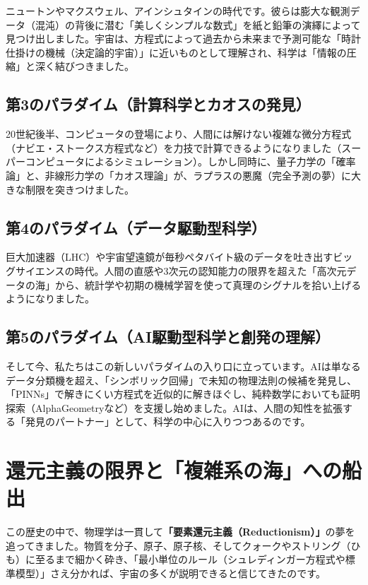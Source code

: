 ニュートンやマクスウェル、アインシュタインの時代です。彼らは膨大な観測データ（混沌）の背後に潜む「美しくシンプルな数式」を紙と鉛筆の演繹によって見つけ出しました。宇宙は、方程式によって過去から未来まで予測可能な「時計仕掛けの機械（決定論的宇宙）」に近いものとして理解され、科学は「情報の圧縮」と深く結びつきました。

\subsection{第3のパラダイム（計算科学とカオスの発見）}

20世紀後半、コンピュータの登場により、人間には解けない複雑な微分方程式（ナビエ・ストークス方程式など）を力技で計算できるようになりました（スーパーコンピュータによるシミュレーション）。しかし同時に、量子力学の「確率論」と、非線形力学の「カオス理論」が、ラプラスの悪魔（完全予測の夢）に大きな制限を突きつけました。

\subsection{第4のパラダイム（データ駆動型科学）}

巨大加速器（LHC）や宇宙望遠鏡が毎秒ペタバイト級のデータを吐き出すビッグサイエンスの時代。人間の直感や3次元の認知能力の限界を超えた「高次元データの海」から、統計学や初期の機械学習を使って真理のシグナルを拾い上げるようになりました。

\subsection{第5のパラダイム（AI駆動型科学と創発の理解）}

そして今、私たちはこの新しいパラダイムの入り口に立っています。AIは単なるデータ分類機を超え、「シンボリック回帰」で未知の物理法則の候補を発見し、「PINNs」で解きにくい方程式を近似的に解きほぐし、純粋数学においても証明探索（AlphaGeometryなど）を支援し始めました。AIは、人間の知性を拡張する「発見のパートナー」として、科学の中心に入りつつあるのです。

\section{還元主義の限界と「複雑系の海」への船出}

この歴史の中で、物理学は一貫して\textbf{「要素還元主義（Reductionism）」}の夢を追ってきました。物質を分子、原子、原子核、そしてクォークやストリング（ひも）に至るまで細かく砕き、「最小単位のルール（シュレディンガー方程式や標準模型）」さえ分かれば、宇宙の多くが説明できると信じてきたのです。

